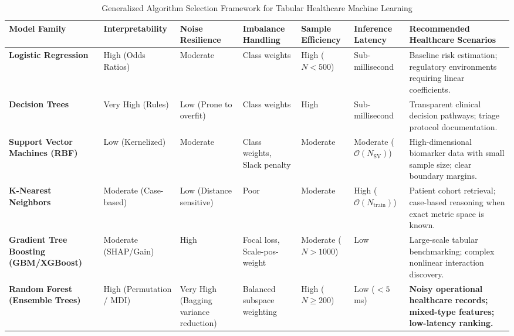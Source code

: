 \documentclass[conference]{IEEEtran}
\begin{document}
\begin{table}[t]
\caption{Generalized Algorithm Selection Framework for Tabular Healthcare Machine Learning}
\label{tab:framework}
\centering
\begin{tabular}{p{2.8cm}p{1.8cm}p{1.8cm}p{1.8cm}p{1.8cm}p{1.8cm}p{3.2cm}}
\toprule
\textbf{Model Family} & \textbf{Interpretability} & \textbf{Noise Resilience} & \textbf{Imbalance Handling} & \textbf{Sample Efficiency} & \textbf{Inference Latency} & \textbf{Recommended Healthcare Scenarios} \\
\midrule
\textbf{Logistic Regression} & High (Odds Ratios) & Moderate & Class weights & High ($N < 500$) & Sub-millisecond & Baseline risk estimation; regulatory environments requiring linear coefficients. \\
\addlinespace[0.2em]
\textbf{Decision Trees} & Very High (Rules) & Low (Prone to overfit) & Class weights & High & Sub-millisecond & Transparent clinical decision pathways; triage protocol documentation. \\
\addlinespace[0.2em]
\textbf{Support Vector Machines (RBF)} & Low (Kernelized) & Moderate & Class weights, Slack penalty & Moderate & Moderate ($\mathcal{O}(N_{\text{SV}})$) & High-dimensional biomarker data with small sample size; clear boundary margins. \\
\addlinespace[0.2em]
\textbf{K-Nearest Neighbors} & Moderate (Case-based) & Low (Distance sensitive) & Poor & Moderate & High ($\mathcal{O}(N_{\text{train}})$) & Patient cohort retrieval; case-based reasoning when exact metric space is known. \\
\addlinespace[0.2em]
\textbf{Gradient Tree Boosting (GBM/XGBoost)} & Moderate (SHAP/Gain) & High & Focal loss, Scale-pos-weight & Moderate ($N > 1000$) & Low & Large-scale tabular benchmarking; complex nonlinear interaction discovery. \\
\addlinespace[0.2em]
\textbf{Random Forest (Ensemble Trees)} & High (Permutation / MDI) & Very High (Bagging variance reduction) & Balanced subspace weighting & High ($N \ge 200$) & Low ($<5$ ms) & \textbf{Noisy operational healthcare records; mixed-type features; low-latency ranking.} \\
\bottomrule
\end{tabular}
\end{table}
\end{document}
